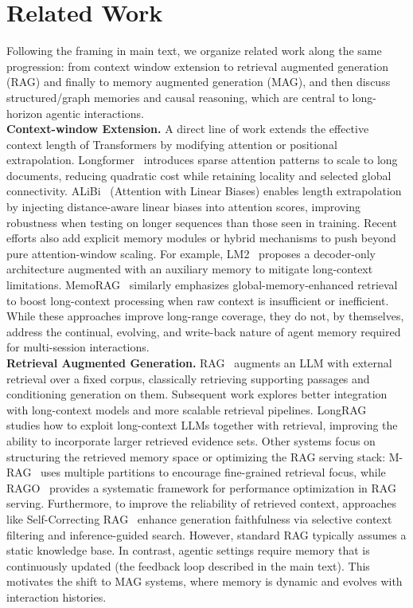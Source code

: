 \documentclass[11pt]{article}
\begin{document}



\appendix

\section{Related Work}
\label{app:relatedwork}
Following the framing in main text, we organize related work along the same progression: from context window extension to retrieval augmented generation (RAG) and finally to memory augmented generation (MAG), and then discuss structured/graph memories and causal reasoning, which are central to long-horizon agentic interactions.\\
\textbf{Context-window Extension.} A direct line of work extends the effective context length of Transformers by modifying attention or positional extrapolation. Longformer~\cite{beltagy2020longformer} introduces sparse attention patterns to scale to long documents, reducing quadratic cost while retaining locality and selected global connectivity. ALiBi~\cite{press2021train} (Attention with Linear Biases) enables length extrapolation by injecting distance-aware linear biases into attention scores, improving robustness when testing on longer sequences than those seen in training. Recent efforts also add explicit memory modules or hybrid mechanisms to push beyond pure attention-window scaling. For example, LM2~\cite{kang2025lm2} proposes a decoder-only architecture augmented with an auxiliary memory to mitigate long-context limitations. MemoRAG~\cite{qian2025memorag} similarly emphasizes global-memory-enhanced retrieval to boost long-context processing when raw context is insufficient or inefficient. While these approaches improve long-range coverage, they do not, by themselves, address the continual, evolving, and write-back nature of agent memory required for multi-session interactions.\\
\textbf{Retrieval Augmented Generation.} RAG~\cite{lewis2020retrieval} augments an LLM with external retrieval over a fixed corpus, classically retrieving supporting passages and conditioning generation on them. Subsequent work explores better integration with long-context models and more scalable retrieval pipelines. LongRAG~\cite{jiang2024longrag} studies how to exploit long-context LLMs together with retrieval, improving the ability to incorporate larger retrieved evidence sets. Other systems focus on structuring the retrieved memory space or optimizing the RAG serving stack: M-RAG~\cite{wang2024m} uses multiple partitions to encourage fine-grained retrieval focus, while RAGO~\cite{jiang2025rago} provides a systematic framework for performance optimization in RAG serving. Furthermore, to improve the reliability of retrieved context, approaches like Self-Correcting RAG~\cite{xu2026selfcorrectingrag} enhance generation faithfulness via selective context filtering and inference-guided search. However, standard RAG typically assumes a static knowledge base. In contrast, agentic settings require memory that is continuously updated (the feedback loop described in the main text). This motivates the shift to MAG systems, where memory is dynamic and evolves with interaction histories.\\
\end{document}
